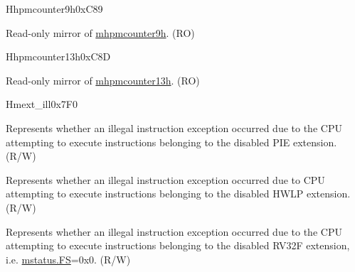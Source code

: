 \begin{register}{H}{hpmcounter9h}{0xC89}\label{regdesc:HPMCOUNTER9H}
%
\regnewline%
\begin{regdesc}\begin{reglist}
\label{fielddesc:HPMCOUNTER9H}\item [HPMCOUNTER9H] Read-only mirror of \hyperref[regdesc:MHPMCOUNTER9H]{mhpmcounter9h}.  (RO)
\end{reglist}\end{regdesc}
\end{register}


\begin{register}{H}{hpmcounter13h}{0xC8D}\label{regdesc:HPMCOUNTER13H}
%
\regnewline%
\begin{regdesc}\begin{reglist}
\label{fielddesc:HPMCOUNTER13H}\item [HPMCOUNTER13H] Read-only mirror of \hyperref[regdesc:MHPMCOUNTER13H]{mhpmcounter13h}.  (RO)
\end{reglist}\end{regdesc}
\end{register}

\begin{register}{H}{mext\_ill}{0x7F0}\label{regdesc:MEXT_ILL}%
%
%
%
%
\regnewline%
\begin{regdesc}\begin{reglist}
\label{fielddesc:MEXT_ILL_PIE_ILL}\item [PIE\_ILL] Represents whether an illegal instruction exception occurred due to the CPU attempting to execute instructions belonging to the disabled PIE extension. (R/W)
\label{fielddesc:MEXT_ILL_HWLP_ILL}\item [HWLP\_ILL] Represents whether an illegal instruction exception occurred due to CPU attempting to execute instructions belonging to the disabled HWLP extension. (R/W)
\label{fielddesc:MEXT_ILL_FP_ILL}\item [FP\_ILL] Represents whether an illegal instruction exception occurred due to the CPU attempting to execute instructions belonging to the disabled RV32F extension, i.e. \hyperref[fielddesc:MSTATUS_FS]{mstatus.FS}=0x0. (R/W)
\end{reglist}\end{regdesc}
\end{register}

